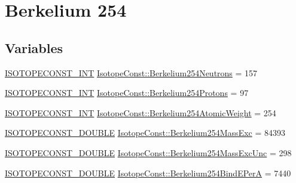 \hypertarget{group___isotope_const-_berkelium-_bk254}{}\section{Berkelium 254}
\label{group___isotope_const-_berkelium-_bk254}
\subsection*{Variables}
\begin{DoxyCompactItemize}
\item 
\mbox{\hyperlink{group___isotope_const-_macros_ga5f18360b3e99483a35c32d789e62621c}{I\+S\+O\+T\+O\+P\+E\+C\+O\+N\+S\+T\+\_\+\+I\+NT}} \mbox{\hyperlink{group___isotope_const-_berkelium-_bk254_ga5d7503428eca0b0368cbcc846b348a1e}{Isotope\+Const\+::\+Berkelium254\+Neutrons}} = 157
\item 
\mbox{\hyperlink{group___isotope_const-_macros_ga5f18360b3e99483a35c32d789e62621c}{I\+S\+O\+T\+O\+P\+E\+C\+O\+N\+S\+T\+\_\+\+I\+NT}} \mbox{\hyperlink{group___isotope_const-_berkelium-_bk254_gabe5121d4741c6dd45adfd8e52ca707ee}{Isotope\+Const\+::\+Berkelium254\+Protons}} = 97
\item 
\mbox{\hyperlink{group___isotope_const-_macros_ga5f18360b3e99483a35c32d789e62621c}{I\+S\+O\+T\+O\+P\+E\+C\+O\+N\+S\+T\+\_\+\+I\+NT}} \mbox{\hyperlink{group___isotope_const-_berkelium-_bk254_gac504e97ec9230fd71eb30f188dad530e}{Isotope\+Const\+::\+Berkelium254\+Atomic\+Weight}} = 254
\item 
\mbox{\hyperlink{group___isotope_const-_macros_ga8f45a7272ce02c0b4c65c44636ed719a}{I\+S\+O\+T\+O\+P\+E\+C\+O\+N\+S\+T\+\_\+\+D\+O\+U\+B\+LE}} \mbox{\hyperlink{group___isotope_const-_berkelium-_bk254_ga964dba46ac53111245177ad55816cc25}{Isotope\+Const\+::\+Berkelium254\+Mass\+Exc}} = 84393
\item 
\mbox{\hyperlink{group___isotope_const-_macros_ga8f45a7272ce02c0b4c65c44636ed719a}{I\+S\+O\+T\+O\+P\+E\+C\+O\+N\+S\+T\+\_\+\+D\+O\+U\+B\+LE}} \mbox{\hyperlink{group___isotope_const-_berkelium-_bk254_gafc0224c2fb82f5fd52f570ab8cb377f1}{Isotope\+Const\+::\+Berkelium254\+Mass\+Exc\+Unc}} = 298
\item 
\mbox{\hyperlink{group___isotope_const-_macros_ga8f45a7272ce02c0b4c65c44636ed719a}{I\+S\+O\+T\+O\+P\+E\+C\+O\+N\+S\+T\+\_\+\+D\+O\+U\+B\+LE}} \mbox{\hyperlink{group___isotope_const-_berkelium-_bk254_gabd21e63cf2d242decc880da5fc82b14e}{Isotope\+Const\+::\+Berkelium254\+Bind\+E\+PerA}} = 7440
\item 

\end{DoxyCompactItemize}
